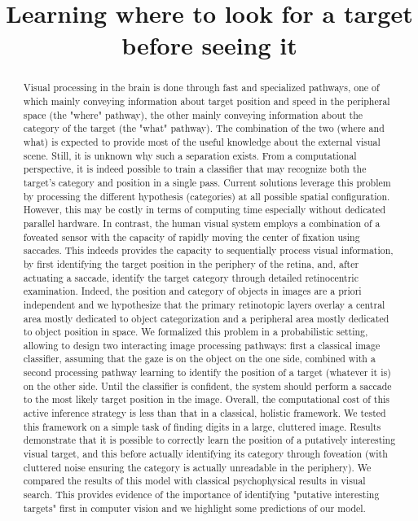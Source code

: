 \documentclass{article}
\title{
Learning where to look for a target before seeing it
}
\author{}
\begin{document}
\maketitle

\begin{abstract}
	
Visual processing in the brain is done through fast and specialized pathways, one of which mainly conveying information about target position and speed in the peripheral space (the "where" pathway), the other mainly conveying  information about the category of the target (the "what" pathway). The combination of the two (where and what) is expected to provide most of the useful knowledge about the external visual scene. Still, it is unknown why such a separation exists. 
From a computational perspective, it is indeed possible to train a classifier that may recognize both the target's category and position in a single  pass. Current solutions leverage this problem by processing the different hypothesis (categories) at all possible spatial configuration. However, this may be costly in terms of computing time especially without dedicated parallel hardware.
In contrast, the human visual system employs a combination of a foveated sensor with the capacity of rapidly moving the center of fixation using saccades. This indeeds provides the capacity to sequentially process visual information, by first identifying the target position in the periphery of the retina, and, after actuating a saccade, identify the target category through detailed retinocentric examination. Indeed, the position and category of objects in images are a priori independent and we hypothesize that the primary retinotopic layers overlay a central area mostly dedicated to object categorization and a peripheral area mostly dedicated to object position in space.
We formalized this problem in a probabilistic setting, allowing to design two interacting image processing pathways: first a classical image classifier, assuming that the gaze is  on the object on the one side, combined with a second processing pathway learning to identify the position of a target (whatever it is) on the other side. Until the classifier is confident, the system should perform a saccade to the most likely target position in the image. Overall, the computational cost of this active inference strategy is less than that in a classical, holistic framework.
We tested this framework on a simple task of finding digits in a large, cluttered image. Results demonstrate that it is possible to correctly learn the position of a putatively interesting visual target, and this before actually identifying its category through foveation (with cluttered noise ensuring the category is actually unreadable in the periphery). We compared the results of this model with classical psychophysical results in visual search. This provides evidence of the importance of identifying "putative interesting targets" first in computer vision and we highlight some predictions of our model.
\end{abstract}

\newpage

%
%
%
%
%
%
%
\end{document}
